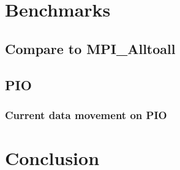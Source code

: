 \documentclass[letter]{article}
\begin{document}
\section{Benchmarks}
\subsection{Compare to MPI\_Alltoall}

\subsection{PIO}

\subsubsection{Current data movement on PIO}

\subsubsection{}

\section{Conclusion}
\end{document}
